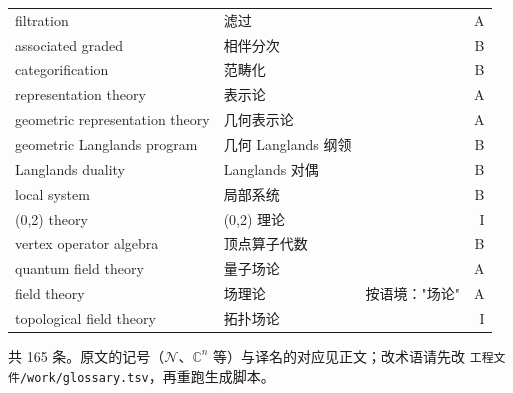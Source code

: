 \begin{longtable}{@{}>{\raggedright\arraybackslash}p{}>{\raggedright\arraybackslash}p{}>{\raggedright\arraybackslash}p{}@{\quad}r@{}}
filtration & 滤过 &  & A\\
associated graded & 相伴分次 &  & B\\
categorification & 范畴化 &  & B\\
representation theory & 表示论 &  & A\\
geometric representation theory & 几何表示论 &  & A\\
geometric Langlands program & 几何 Langlands 纲领 &  & B\\
Langlands duality & Langlands 对偶 &  & B\\
local system & 局部系统 &  & B\\
(0,2) theory & (0,2) 理论 &  & I\\
vertex operator algebra & 顶点算子代数 &  & B\\
quantum field theory & 量子场论 &  & A\\
field theory & 场理论 & 按语境："场论" & A\\
topological field theory & 拓扑场论 &  & I\\
\bottomrule
\end{longtable}

{\sloppy\noindent 共 165 条。原文的记号（$\mathcal{N}$、$\mathbb{C}^n$ 等）与译名的对应见正文；改术语请先改 \texttt{工程文件/work/glossary.tsv}，再重跑生成脚本。\par}
